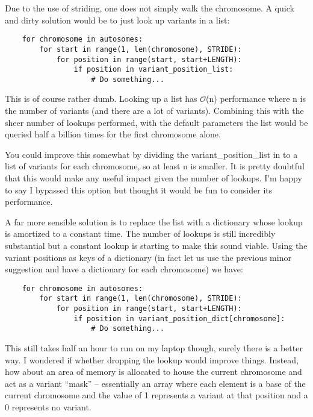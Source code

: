 Due to the use of striding, one does not simply walk the chromosome. A quick
and dirty solution would be to just look up variants in a list:

\begin{verbatim}
    for chromosome in autosomes:
        for start in range(1, len(chromosome), STRIDE):
            for position in range(start, start+LENGTH):
                if position in variant_position_list:
                    # Do something...
\end{verbatim}

This is of course rather dumb. Looking up a list has $\mathcal{O}$(n) performance
where n is the number of variants (and there are a lot of variants). Combining
this with the sheer number of lookups performed, with the default parameters the
list would be queried half a billion times for the first chromosome alone.

You could improve this somewhat by dividing the variant\_position\_list in to a
list of variants for each chromosome, so at least n is smaller. It is pretty
doubtful that this would make any useful impact given the number of lookups.
I’m happy to say I bypassed this option but thought it would be fun to consider
its performance.

A far more sensible solution is to replace the list with a dictionary
whose lookup is amortized to a constant time. The number of lookups is still
incredibly substantial but a constant lookup is starting to make this sound
viable. Using the variant positions as keys of a dictionary (in fact let us use
the previous minor suggestion and have a dictionary for each chromosome) we
have:

\begin{verbatim}
    for chromosome in autosomes:
        for start in range(1, len(chromosome), STRIDE):
            for position in range(start, start+LENGTH):
                if position in variant_position_dict[chromosome]:
                    # Do something...
\end{verbatim}

This still takes half an hour to run on my laptop though, surely there
is a better way.  I wondered if whether dropping the lookup would improve
things. Instead, how about an area of memory is allocated to house the current
chromosome and act as a variant “mask” -- essentially an array where each element
is a base of the current chromosome and the value of 1 represents a variant at
that position and a 0 represents no variant.

